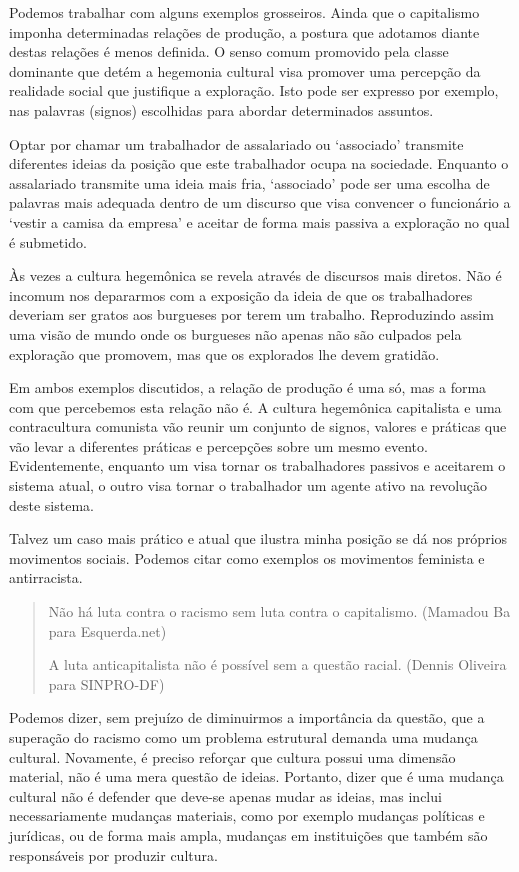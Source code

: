 Podemos trabalhar com alguns exemplos grosseiros. Ainda que o capitalismo imponha determinadas relações de produção, a postura que adotamos diante destas relações é menos definida. O senso comum promovido pela classe dominante que detém a hegemonia cultural visa promover uma percepção da realidade social que justifique a exploração. Isto pode ser expresso por exemplo, nas palavras (signos) escolhidas para abordar determinados assuntos.

Optar por chamar um trabalhador de assalariado ou ‘associado’ transmite diferentes ideias da posição que este trabalhador ocupa na sociedade. Enquanto o assalariado transmite uma ideia mais fria, ‘associado’ pode ser uma escolha de palavras mais adequada dentro de um discurso que visa convencer o funcionário a ‘vestir a camisa da empresa’ e aceitar de forma mais passiva a exploração no qual é submetido.

Às vezes a cultura hegemônica se revela através de discursos mais diretos. Não é incomum nos depararmos com a exposição da ideia de que os trabalhadores deveriam ser gratos aos burgueses por terem um trabalho. Reproduzindo assim uma visão de mundo onde os burgueses não apenas não são culpados pela exploração que promovem, mas que os explorados lhe devem gratidão. 

Em ambos exemplos discutidos, a relação de produção é uma só, mas a forma com que percebemos esta relação não é. A cultura hegemônica capitalista e uma contracultura comunista vão reunir um conjunto de signos, valores e práticas que vão levar a diferentes práticas e percepções sobre um mesmo evento. Evidentemente, enquanto um visa tornar os trabalhadores passivos e aceitarem o sistema atual, o outro visa tornar o trabalhador um agente ativo na revolução deste sistema.

Talvez um caso mais prático e atual que ilustra minha posição se dá nos próprios movimentos sociais. Podemos citar como exemplos os movimentos feminista e antirracista.

\begin{quote}
Não há luta contra o racismo sem luta contra o capitalismo. (Mamadou Ba para Esquerda.net)

A luta anticapitalista não é possível sem a questão racial. (Dennis Oliveira para SINPRO-DF)
\end{quote}

Podemos dizer, sem prejuízo de diminuirmos a importância da questão, que a superação do racismo como um problema estrutural demanda uma mudança cultural. Novamente, é preciso reforçar que cultura possui uma dimensão material, não é uma mera questão de ideias. Portanto, dizer que é uma mudança cultural não é defender que deve-se apenas mudar as ideias, mas inclui necessariamente mudanças materiais, como por exemplo mudanças políticas e jurídicas, ou de forma mais ampla, mudanças em instituições que também são responsáveis por produzir cultura.

